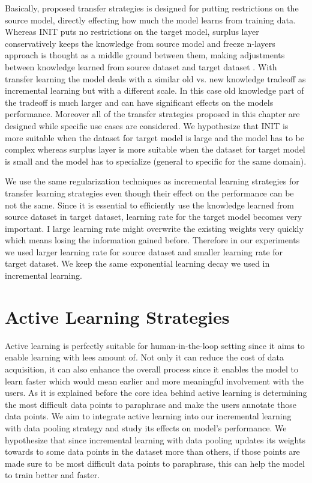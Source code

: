 Basically, proposed transfer strategies is designed for putting restrictions on the source model, directly effecting how much the model learns from training data. Whereas INIT puts no restrictions on the target model, surplus layer conservatively keeps the knowledge from source model and freeze n-layers approach is thought as a middle ground between them, making adjustments between knowledge learned from source dataset and target dataset . With transfer learning the model deals with a similar old vs. new knowledge tradeoff as incremental learning but with a different scale. In this case old knowledge part of the tradeoff is much larger and can have significant effects on the models performance. Moreover all of the transfer strategies proposed in this chapter are designed while specific use cases are considered. We hypothesize that INIT is more suitable when the dataset for target model is large and the model has to be complex whereas surplus layer is more suitable when the dataset for target model is small and the model has to specialize (general to specific for the same domain). 

We use the same regularization techniques as incremental learning strategies for transfer learning strategies even though their effect on the performance can be not the same. Since it is essential to efficiently use the knowledge learned from source dataset in target dataset, learning rate for the target model becomes very important. I large learning rate might overwrite the existing weights very quickly which means losing the information gained before. Therefore in our experiments we used larger learning rate for source dataset and smaller learning rate for target dataset. We keep the same exponential learning decay we used in incremental learning.

\section{Active Learning Strategies}

Active learning is perfectly suitable for human-in-the-loop setting since it aims to enable learning with lees amount of. Not only it can reduce the cost of data acquisition, it can also enhance the overall process since it enables the model to learn faster which would mean earlier and more meaningful involvement with the users. As it is explained before the core idea behind active learning is determining the most difficult data points to paraphrase and make the users annotate those data points. We aim to integrate active learning into our incremental learning with data pooling strategy and study its effects on model's performance. We hypothesize that since incremental learning with data pooling updates its weights towards to some data points in the dataset more than others, if those points are made sure to be most difficult data points to paraphrase, this can help the model to train better and faster.

